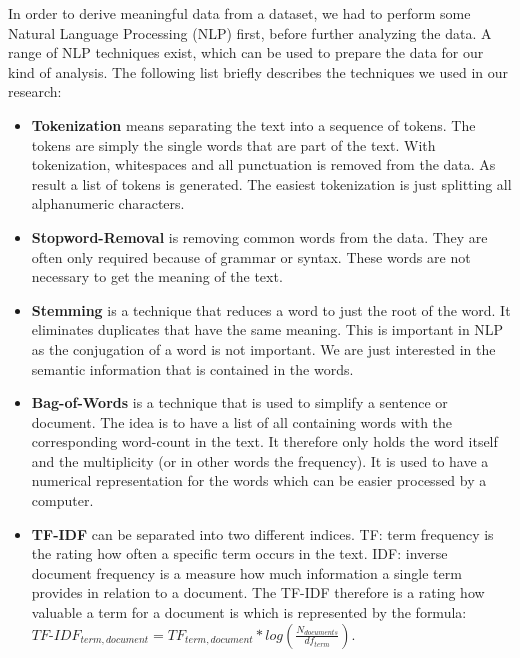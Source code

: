In order to derive meaningful data from a dataset, we had to perform some Natural Language Processing (NLP) first, before further analyzing the data. A range of NLP techniques exist, which can be used to prepare the data for our kind of analysis\cite{solangi_review_2018}\cite{ferrari_natural_2018}. The following list briefly describes the techniques we used in our research:

\begin{itemize}
	\item \textbf{Tokenization} means separating the text into a sequence of tokens. The tokens are simply the single words that are part of the text. With tokenization, whitespaces and all punctuation is removed from the data. As result a list of tokens is generated. The easiest tokenization is just splitting all alphanumeric characters.
	\item \textbf{Stopword-Removal} is removing common words from the data. They are often only required because of grammar or syntax. These words are not necessary to get the meaning of the text.
	\item \textbf{Stemming} is a technique that reduces a word to just the root of the word. It eliminates duplicates that have the same meaning. This is important in NLP as the conjugation of a word is not important. We are just interested in the semantic information that is contained in the words.
	\item \textbf{Bag-of-Words} is a technique that is used to simplify a sentence or document. The idea is to have a list of all containing words with the corresponding word-count in the text. It therefore only holds the word itself and the multiplicity (or in other words the frequency). It is used to have a numerical representation for the words which can be easier processed by a computer.
	\item \textbf{TF-IDF} can be separated into two different indices. TF: term frequency is the rating how often a specific term occurs in the text. IDF: inverse document frequency is a measure how much information a single term provides in relation to a document. The TF-IDF therefore is a rating how valuable a term for a document is which is represented by the formula: ${TF\text{-}IDF}_{term, document}=TF_{term, document} * log(\frac{N_{documents}}{df_{term}})$.
\end{itemize}